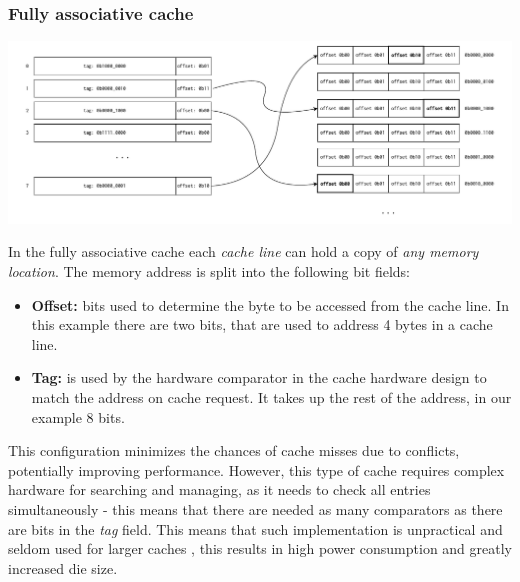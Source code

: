 \subsubsection{Fully associative cache}
\begin{center}
	\centering
	\includegraphics[width=\textwidth]{figures/02-background/full_ass_mem.pdf}
	\label{fig:full_ass_mem}
\end{center}

\noindent In the fully associative cache each \textit{cache line} can hold a copy of \textit{any memory location}. The memory address is split into the following bit fields:

\begin{itemize}
	\item \textbf{Offset:} bits used to determine the byte to be accessed from the cache line. In this example there are two bits, that are used to address 4 bytes in a cache line.
	\item \textbf{Tag:} is used by the hardware comparator in the cache hardware design to match the address on cache request. It takes up the rest of the address, in our example 8 bits.
\end{itemize}


\noindent This configuration minimizes the chances of cache misses due to conflicts, potentially improving performance. However, this type of cache requires complex hardware for
searching and managing, as it needs to check all entries simultaneously - this means that there are needed as many comparators as there are bits in the \textit{tag} field.
This means that such implementation is unpractical and seldom used for larger caches \cite{whatevery}, this results in high power consumption and greatly increased die size.

